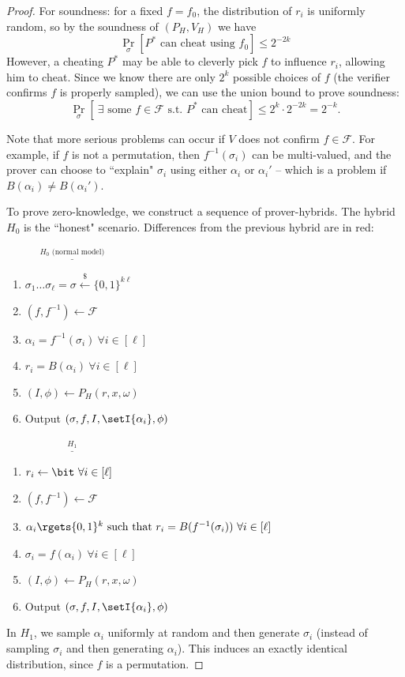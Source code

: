 \begin{proof}
For soundness: for a fixed $f = f_0$, the distribution of $r_i$ is
uniformly random, so by the soundness of $(P_H, V_H)$ we have
$$\Pr_\sigma[\text{$P^*$ can cheat using $f_0$}] \leq 2^{-2k}$$
However, a cheating $P^*$ may be able to cleverly pick $f$ to influence $r_i$,
allowing him to cheat. Since we know there are only $2^k$ possible choices of
$f$ (the verifier confirms $f$ is properly sampled), we can use the union bound
to prove soundness:
$$\Pr_\sigma[~\exists \text{ some $f \in \mathcal{F}$ s.t. $P^*$ can cheat}] \leq 2^{k} \cdot 2^{-2k} = 2^{-k}.$$

Note that more serious problems can occur if $V$ does not confirm $f\in \mathcal{F}$. For example, if $f$ is not a permutation, then
$f^{-1}(\sigma_i)$ can be multi-valued, and the prover can choose to ``explain"
$\sigma_i$ using either $\alpha_i$ or $\alpha_i'$ -- which is a problem if
$B(\alpha_i) \neq B(\alpha_i')$.

To prove zero-knowledge, we construct a sequence of prover-hybrids. The hybrid $H_0$ is the ``honest" scenario. Differences from the previous hybrid are in red:


\newcommand{\htitle}[1]{\vspace{0.3cm}$\overset{#1}{\underline{\hspace{5cm}}}$}
\newcommand{\diff}[1]{{\color{red} #1}}

\htitle{H_0 \text{ (normal model)}}
\begin{enumerate}
    \item $\sigma_1\hdots\sigma_\ell = \sigma \xleftarrow{\$} \{0,1\}^{k\ell}$
    \item $(f, f^{-1}) \gets \mathcal{F}$
    \item $\alpha_i = f^{-1}(\sigma_i) ~\forall i \in [\ell]$
    \item $r_i = B(\alpha_i) ~\forall i \in [\ell]$
    \item $(I, \phi) \gets P_H(r, x, \omega)$
    \item Output $(\sigma, f, I, \setI{\alpha_i}, \phi)$
\end{enumerate}

\htitle{H_1}
\begin{enumerate}
    \item \diff{$r_i \gets \bit ~\forall i \in [\ell]$}
    \item $(f, f^{-1}) \gets \mathcal{F}$
    \item \diff{$\alpha_i \rgets \{0, 1\}^k\ \text{such that}\ r_i = B(f^{-1}(\sigma_i)) ~\forall i \in [\ell]$}
    \item \diff{$\sigma_i = f(\alpha_i) ~\forall i \in [\ell]$}
    \item $(I, \phi) \gets P_H(r, x, \omega)$
    \item Output $(\sigma, f, I, \setI{\alpha_i}, \phi)$
\end{enumerate}
In $H_1$, we sample $\alpha_i$ uniformly at random and then generate $\sigma_i$ (instead of
sampling $\sigma_i$ and then generating $\alpha_i$). This induces an exactly identical distribution, since $f$
is a permutation.


\end{proof}
